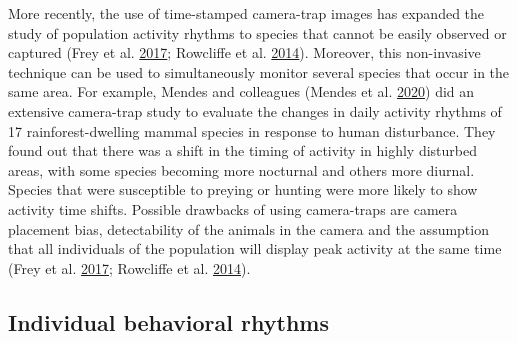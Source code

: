 \documentclass[msc,numbers,hidelinks]{coppe}
\begin{document}
  More recently, the use of time-stamped camera-trap images has expanded the study of population activity rhythms to species that cannot be easily observed or captured (Frey et al. \protect\hyperlink{ref-freyInvestigatingAnimalActivity2017}{2017}; Rowcliffe et al. \protect\hyperlink{ref-rowcliffeQuantifyingLevelsAnimal2014}{2014}). Moreover, this non-invasive technique can be used to simultaneously monitor several species that occur in the same area. For example, Mendes and colleagues (Mendes et al. \protect\hyperlink{ref-mendesLandscapeHumanFear2020}{2020}) did an extensive camera-trap study to evaluate the changes in daily activity rhythms of 17 rainforest-dwelling mammal species in response to human disturbance. They found out that there was a shift in the timing of activity in highly disturbed areas, with some species becoming more nocturnal and others more diurnal. Species that were susceptible to preying or hunting were more likely to show activity time shifts. Possible drawbacks of using camera-traps are camera placement bias, detectability of the animals in the camera and the assumption that all individuals of the population will display peak activity at the same time (Frey et al. \protect\hyperlink{ref-freyInvestigatingAnimalActivity2017}{2017}; Rowcliffe et al. \protect\hyperlink{ref-rowcliffeQuantifyingLevelsAnimal2014}{2014}).

  \hypertarget{individual-behavioral-rhythms}{%
  \subsection{Individual behavioral rhythms}\label{individual-behavioral-rhythms}}
\end{document}

